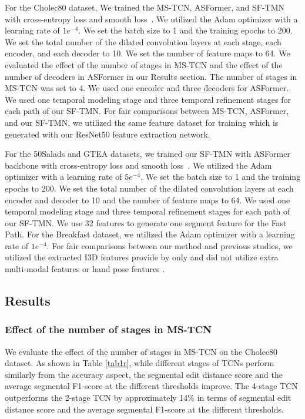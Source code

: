 \documentclass[sn-mathphys,Numbered]{sn-jnl}
\theoremstyle{thmstyleone}\newtheorem{theorem}{Theorem}\newtheorem{proposition}[theorem]{Proposition}
\theoremstyle{thmstyletwo}\newtheorem{example}{Example}\newtheorem{remark}{Remark}
\theoremstyle{thmstylethree}\newtheorem{definition}{Definition}
\begin{document}
For the Cholec80 dataset, We trained the MS-TCN, ASFormer, and SF-TMN with cross-entropy loss and smooth loss~\cite{farha2019ms}. We utilized the Adam optimizer with a learning rate of $1e^{-4}$. We set the batch size to 1 and the training epochs to 200. We set the total number of the dilated convolution layers at each stage, each encoder, and each decoder to 10. We set the number of feature maps to 64. We evaluated the effect of the number of stages in MS-TCN and the effect of the number of decoders in ASFormer in our Results section. The number of stages in MS-TCN was set to 4. We used one encoder and three decoders for ASFormer. We used one temporal modeling stage and three temporal refinement stages for each path of our SF-TMN. For fair comparisons between MS-TCN, ASFormer, and our SF-TMN, we utilized the same feature dataset for training which is generated with our ResNet50 feature extraction network.

For the 50Salads and GTEA datasets, we trained our SF-TMN with ASFormer backbone with cross-entropy loss and smooth loss~\cite{farha2019ms}. We utilized the Adam optimizer with a learning rate of $5e^{-4}$. We set the batch size to 1 and the training epochs to 200. We set the total number of the dilated convolution layers at each encoder and decoder to 10 and the number of feature maps to 64. We used one temporal modeling stage and three temporal refinement stages for each path of our SF-TMN. We use 32 features to generate one segment feature for the Fast Path. For the Breakfast dataset, we utilized the Adam optimizer with a learning rate of $1e^{-4}$. For fair comparisons between our method and previous studies, we utilized the extracted I3D features provide by \cite{farha2019ms} only and did not utilize extra multi-modal features \cite{li2022bridge, van2023aspnet} or hand pose features \cite{ishihara2022mcfm}.

\subsection{Results}


\subsubsection{Effect of the number of stages in MS-TCN}

We evaluate the effect of the number of stages in MS-TCN on the Cholec80 dataset. As shown in Table \ref{tab1r}, while different stages of TCNs perform similarly from the accuracy aspect,  the segmental edit distance score and the average segmental F1-score at the different thresholds improve. The 4-stage TCN outperforms the 2-stage TCN by approximately 14\% in terms of segmental edit distance score and the average segmental F1-score at the different thresholds. 
\end{document}
